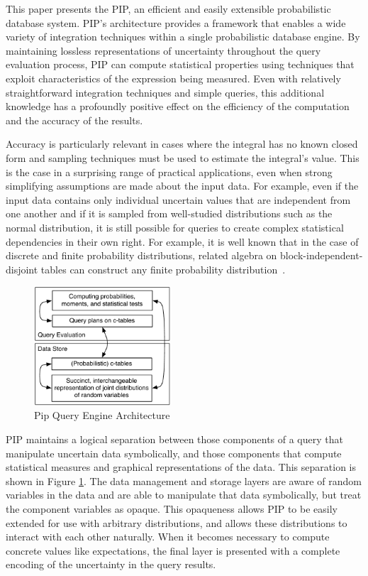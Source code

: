This paper presents the PIP, an efficient and easily extensible probabilistic database system.  PIP's architecture provides a framework that enables a wide variety of integration techniques within a single probabilistic database engine.  By maintaining lossless representations of uncertainty throughout the query evaluation process, PIP can compute statistical properties using techniques that exploit characteristics of the expression being measured.  Even with relatively straightforward integration techniques and simple queries, this additional knowledge has a profoundly positive effect on the efficiency of the computation and the accuracy of the results.

Accuracy is particularly relevant in cases where the integral has no known closed form and sampling techniques must be used to estimate the integral's value.  This is the case in a surprising range of practical applications, even when strong simplifying assumptions are made about the input data.  For example, even if the input data contains only individual uncertain values that are independent from one another and if it is sampled from well-studied distributions such as the normal distribution, it is still possible for queries to create complex statistical dependencies in their own right.  For example, it is well known that in the case of discrete and finite probability distributions, related algebra on block-independent-disjoint tables can construct any finite probability distribution\ \cite{1325861,IL1984}.

%
\begin{figure}
\begin{center}
\includegraphics[width=2in]{graphics/arch.pdf}
\caption{Pip Query Engine Architecture}
\label{fig:arch}
\end{center}
\end{figure}

PIP maintains a logical separation between those components of a query that manipulate uncertain data symbolically, and those components that compute statistical measures and graphical representations of the data.  This separation is shown in Figure \ref{fig:arch}.  The data management and storage layers are aware of random variables in the data and are able to manipulate that data symbolically, but treat the component variables as opaque.  This opaqueness allows PIP to be easily extended for use with arbitrary distributions, and allows these distributions to interact with each other naturally.  When it becomes necessary to compute concrete values like expectations, the final layer is presented with a complete encoding of the uncertainty in the query results.  

